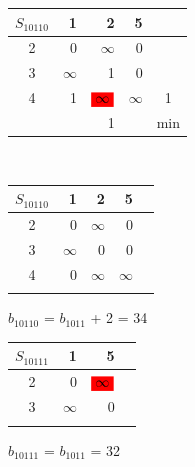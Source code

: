 \documentclass[12pt]{article}
\begin{document}
\begin{flushleft}
\begin{tabular}{c||rrr||c}
$S_{10110}$ & 1 & 2  & 5 &  \\
\hline
\hline
2 & 0 & $\infty$   & 0 &  \\
3 & $\infty$ & 1   & 0 &  \\
4 & 1 & $\colorbox{red}{$\infty$}$   & $\infty$ &  1\\
\hline
\hline
 &  & 1     && min \\
\end{tabular}
$\qquad $ 
\begin{tabular}{c||rrr||c}
$S_{10110}$ & 1 & 2  & 5 &  \\
\hline
\hline
2 & 0 & $\infty$   & 0 &  \\
3 & $\infty$ & 0   & 0 &  \\
4 & 0 & $\infty$   & $\infty$ & \\
\hline
\hline
 &  &    & \\
\end{tabular}
\end{flushleft}

$b_{10110}$ = $b_{1011}$ + 2 = 34\\

\begin{flushleft}
\begin{tabular}{c||rr||c}
$S_{10111}$ & 1   & 5 &  \\
\hline
\hline
2 & 0 &  $\colorbox{red}{$\infty$}$ &  \\
3 & $\infty$    & 0 &  \\
\hline
\hline
     &  & \\
\end{tabular}
\end{flushleft}

$b_{10111}$ = $b_{1011}$ = 32\\
\end{document}
